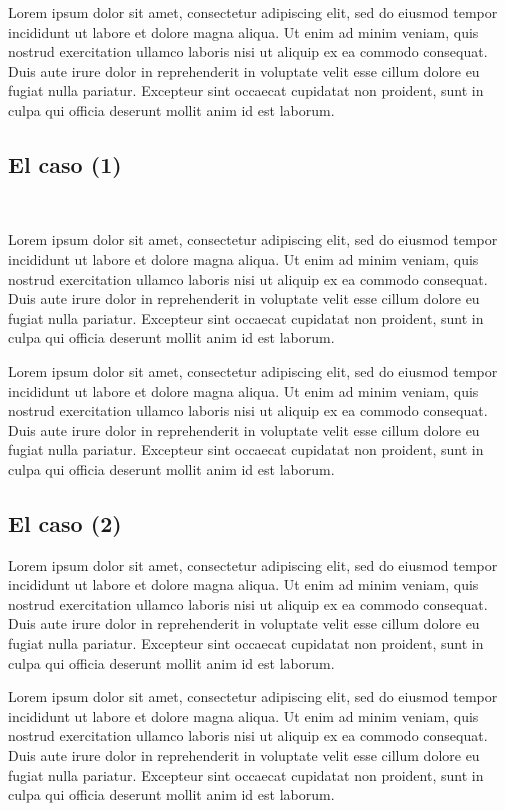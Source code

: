 \documentclass[12pt]{article} %
\begin{document}
Lorem ipsum dolor sit amet, consectetur adipiscing elit, sed do eiusmod tempor incididunt ut labore et dolore magna aliqua. Ut enim ad minim veniam, quis nostrud exercitation ullamco laboris nisi ut aliquip ex ea commodo consequat. Duis aute irure dolor in reprehenderit in voluptate velit esse cillum dolore eu fugiat nulla pariatur. Excepteur sint occaecat cupidatat non proident, sunt in culpa qui officia deserunt mollit anim id est laborum.


\subsection{El caso (1)}  


Lorem ipsum dolor sit amet, consectetur adipiscing elit, sed do eiusmod tempor incididunt ut labore et dolore magna aliqua. Ut enim ad minim veniam, quis nostrud exercitation ullamco laboris nisi ut aliquip ex ea commodo consequat. Duis aute irure dolor in reprehenderit in voluptate velit esse cillum dolore eu fugiat nulla pariatur. Excepteur sint occaecat cupidatat non proident, sunt in culpa qui officia deserunt mollit anim id est laborum.

Lorem ipsum dolor sit amet, consectetur adipiscing elit, sed do eiusmod tempor incididunt ut labore et dolore magna aliqua. Ut enim ad minim veniam, quis nostrud exercitation ullamco laboris nisi ut aliquip ex ea commodo consequat. Duis aute irure dolor in reprehenderit in voluptate velit esse cillum dolore eu fugiat nulla pariatur. Excepteur sint occaecat cupidatat non proident, sunt in culpa qui officia deserunt mollit anim id est laborum.


\subsection{El caso (2)}


Lorem ipsum dolor sit amet, consectetur adipiscing elit, sed do eiusmod tempor incididunt ut labore et dolore magna aliqua. Ut enim ad minim veniam, quis nostrud exercitation ullamco laboris nisi ut aliquip ex ea commodo consequat. Duis aute irure dolor in reprehenderit in voluptate velit esse cillum dolore eu fugiat nulla pariatur. Excepteur sint occaecat cupidatat non proident, sunt in culpa qui officia deserunt mollit anim id est laborum.

Lorem ipsum dolor sit amet, consectetur adipiscing elit, sed do eiusmod tempor incididunt ut labore et dolore magna aliqua. Ut enim ad minim veniam, quis nostrud exercitation ullamco laboris nisi ut aliquip ex ea commodo consequat. Duis aute irure dolor in reprehenderit in voluptate velit esse cillum dolore eu fugiat nulla pariatur. Excepteur sint occaecat cupidatat non proident, sunt in culpa qui officia deserunt mollit anim id est laborum.
\end{document}
